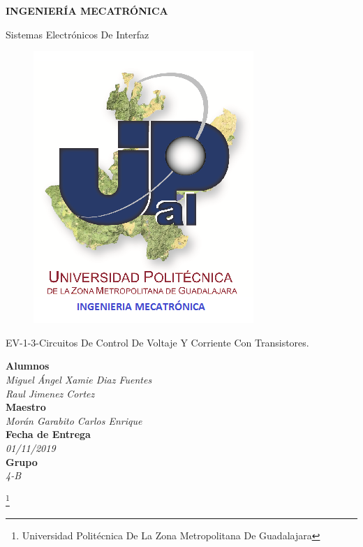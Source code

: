 \documentclass[10pt,a4paper]{article}
\author{Miguel Angel Xamie Diaz Fuentes/Jimenez Cortes Raul}
\begin{document}
\begin{center}
\begin{LARGE}
\textbf{INGENIERÍA MECATRÓNICA}\\
\end{LARGE}
{\large Sistemas Electrónicos De Interfaz}\\
\begin{figure}[hbtp]
\centering
\includegraphics[scale=0.80]{UPZMG_Mecatr_nica.png}
\end{figure} 
\begin{center}
\begin{LARGE}
EV-1-3-Circuitos De Control De Voltaje Y Corriente Con Transistores.
\end{LARGE}
\end{center}

\begin{Large}
\textbf{Alumnos}
\\\textit{Miguel Ángel Xamie Diaz Fuentes\\Raul Jimenez Cortez}
\textbf{\\Maestro}
\\\textit{Morán Garabito Carlos Enrique}
\textbf{\\Fecha de Entrega}
\\\textit{01/11/2019}
\textbf{\\Grupo}
\\\textit{4-B}
\end{Large}

\end{center}

\footnote{Universidad Politécnica De La Zona Metropolitana De Guadalajara} 
\end{document}
